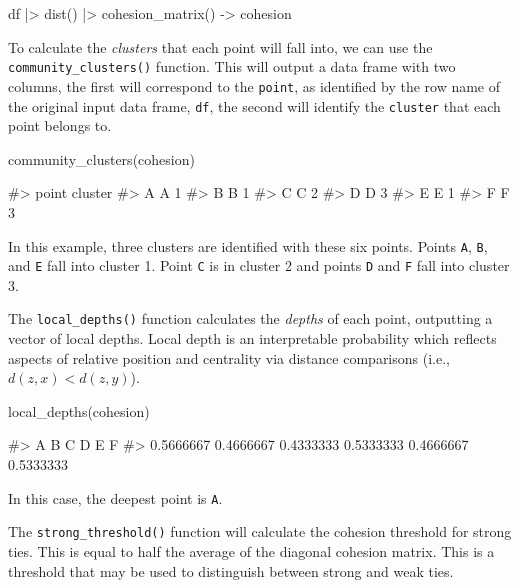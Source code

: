 \begin{Schunk}
\begin{Sinput}
df |>
  dist() |>
  cohesion_matrix() -> cohesion
\end{Sinput}
\end{Schunk}

To calculate the \emph{clusters} that each point will fall into, we can
use the \texttt{community\_clusters()} function. This will output a data
frame with two columns, the first will correspond to the \texttt{point},
as identified by the row name of the original input data frame,
\texttt{df}, the second will identify the \texttt{cluster} that each
point belongs to.

\begin{Schunk}
\begin{Sinput}
community_clusters(cohesion)
\end{Sinput}
\begin{Soutput}
#>   point cluster
#> A     A       1
#> B     B       1
#> C     C       2
#> D     D       3
#> E     E       1
#> F     F       3
\end{Soutput}
\end{Schunk}

In this example, three clusters are identified with these six points.
Points \texttt{A}, \texttt{B}, and \texttt{E} fall into cluster 1. Point
\texttt{C} is in cluster 2 and points \texttt{D} and \texttt{F} fall
into cluster 3.

The \texttt{local\_depths()} function calculates the \emph{depths} of
each point, outputting a vector of local depths. Local depth is an
interpretable probability which reflects aspects of relative position
and centrality via distance comparisons (i.e., \(d(z, x) < d(z, y)\)).

\begin{Schunk}
\begin{Sinput}
local_depths(cohesion)
\end{Sinput}
\begin{Soutput}
#>         A         B         C         D         E         F 
#> 0.5666667 0.4666667 0.4333333 0.5333333 0.4666667 0.5333333
\end{Soutput}
\end{Schunk}

In this case, the deepest point is \texttt{A}.

The \texttt{strong\_threshold()} function will calculate the cohesion
threshold for strong ties. This is equal to half the average of the
diagonal cohesion matrix. This is a threshold that may be used to
distinguish between strong and weak ties.

